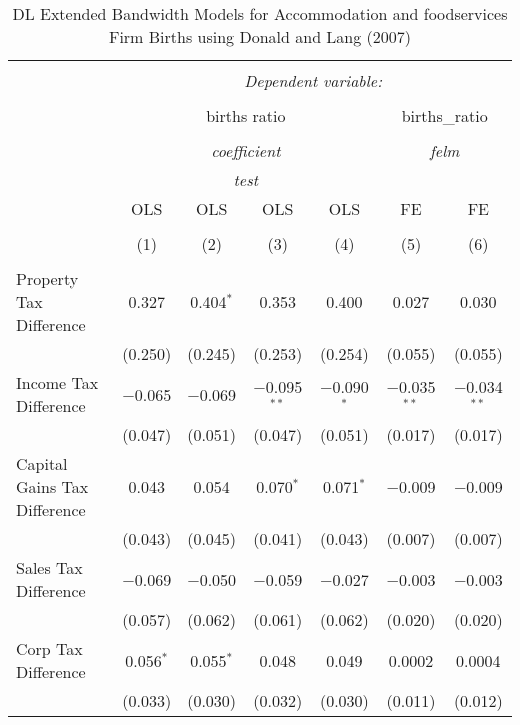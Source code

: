 
\begin{table}[!htbp] \centering 
  \caption{DL Extended Bandwidth Models for  Accommodation and foodservices Firm Births using Donald and Lang (2007)} 
  \label{} 
\begin{tabular}{@{\extracolsep{5pt}}lcccccc} 
\\[-1.8ex]\hline 
\hline \\[-1.8ex] 
 & \multicolumn{6}{c}{\textit{Dependent variable:}} \\ 
\cline{2-7} 
\\[-1.8ex] & \multicolumn{4}{c}{births ratio} & \multicolumn{2}{c}{births\_ratio} \\ 
\\[-1.8ex] & \multicolumn{4}{c}{\textit{coefficient}} & \multicolumn{2}{c}{\textit{felm}} \\ 
 & \multicolumn{4}{c}{\textit{test}} & \multicolumn{2}{c}{\textit{}} \\ 
 & OLS & OLS & OLS & OLS & FE & FE \\ 
\\[-1.8ex] & (1) & (2) & (3) & (4) & (5) & (6)\\ 
\hline \\[-1.8ex] 
 Property Tax Difference & 0.327 & 0.404$^{*}$ & 0.353 & 0.400 & 0.027 & 0.030 \\ 
  & (0.250) & (0.245) & (0.253) & (0.254) & (0.055) & (0.055) \\ 
  Income Tax Difference & $-$0.065 & $-$0.069 & $-$0.095$^{**}$ & $-$0.090$^{*}$ & $-$0.035$^{**}$ & $-$0.034$^{**}$ \\ 
  & (0.047) & (0.051) & (0.047) & (0.051) & (0.017) & (0.017) \\ 
  Capital Gains Tax Difference & 0.043 & 0.054 & 0.070$^{*}$ & 0.071$^{*}$ & $-$0.009 & $-$0.009 \\ 
  & (0.043) & (0.045) & (0.041) & (0.043) & (0.007) & (0.007) \\ 
  Sales Tax Difference & $-$0.069 & $-$0.050 & $-$0.059 & $-$0.027 & $-$0.003 & $-$0.003 \\ 
  & (0.057) & (0.062) & (0.061) & (0.062) & (0.020) & (0.020) \\ 
  Corp Tax Difference & 0.056$^{*}$ & 0.055$^{*}$ & 0.048 & 0.049 & 0.0002 & 0.0004 \\ 
  & (0.033) & (0.030) & (0.032) & (0.030) & (0.011) & (0.012) \\ 

\end{tabular}
\end{table}
